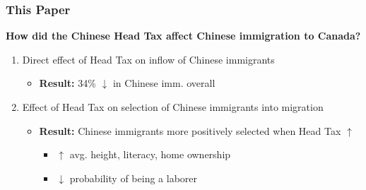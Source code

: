 \documentclass[xcolor=dvipsnames, compress, 12pt, aspectratio=169, handout]{beamer}
\begin{document}
\begin{frame}
    \frametitle{This Paper}
    \textbf{How did the Chinese Head Tax affect Chinese immigration to Canada?}
    \vspace{2mm}
    \begin{enumerate}
        \item Direct effect of Head Tax on inflow of Chinese immigrants 
        \vspace{3mm}
        \begin{itemize}
            \item \textbf{Result:} 34\% $\downarrow$ in Chinese imm. overall
        \end{itemize}
        \vspace{3mm}
        \item Effect of Head Tax on selection of Chinese immigrants into migration 
        \vspace{2mm}
        \begin{itemize}
            \item \textbf{Result:} Chinese immigrants more positively selected when Head Tax $\uparrow$
            \vspace{1mm}
            \begin{itemize}
                \item $\uparrow$ avg. height, literacy, home ownership \vspace{1mm}
                \item $\downarrow$ probability of being a laborer
            \end{itemize}
        \end{itemize}
    \end{enumerate}
\end{frame}
\end{document}
